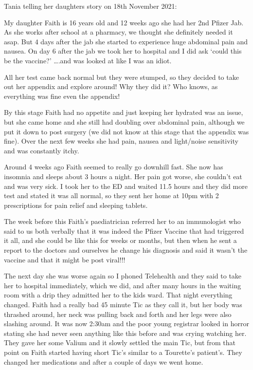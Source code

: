 Tania telling her daughters story on 18th November 2021:

My daughter Faith is 16 years old and 12 weeks ago she had her 2nd Pfizer
Jab. As she works after school at a pharmacy, we thought she definitely needed
it asap. But 4 days after the jab she started to experience huge abdominal pain
and nausea. On day 6 after the jab we took her to hospital and I did ask ‘could
this be the vaccine?’ ….and was looked at like I was an idiot.

All her test came back normal but they were stumped, so they decided to take out
her appendix and explore around! Why they did it? Who knows, as everything was
fine even the appendix!

By this stage Faith had no appetite and just keeping her hydrated was an issue,
but she came home and she still had doubling over abdominal pain, although we
put it down to post surgery (we did not know at this stage that the appendix was
fine). Over the next few weeks she had pain, nausea and light/noise sensitivity
and was constantly itchy.

Around 4 weeks ago Faith seemed to really go downhill fast. She now has insomnia
and sleeps about 3 hours a night. Her pain got worse, she couldn’t eat and was
very sick. I took her to the ED and waited 11.5 hours and they did more test and
stated it was all normal, so they sent her home at 10pm with 2 prescriptions for
pain relief and sleeping tablets.

The week before this Faith’s paediatrician referred her to an immunologist who
said to us both verbally that it was indeed the Pfizer Vaccine that had
triggered it all, and she could be like this for weeks or months, but then when
he sent a report to the doctors and ourselves he change his diagnosis and said
it wasn’t the vaccine and that it might be post viral!!!

The next day she was worse again so I phoned Telehealth and they said to take
her to hospital immediately, which we did, and after many hours in the waiting
room with a drip they admitted her to the kids ward. That night everything
changed. Faith had a really bad 45 minute Tic as they call it, but her body was
thrashed around, her neck was pulling back and forth and her legs were also
slashing around. It was now 2:30am and the poor young registrar looked in horror
stating she had never seen anything like this before and was crying watching
her. They gave her some Valium and it slowly settled the main Tic, but from that
point on Faith started having short Tic’s similar to a Tourette’s
patient’s. They changed her medications and after a couple of days we went home.

